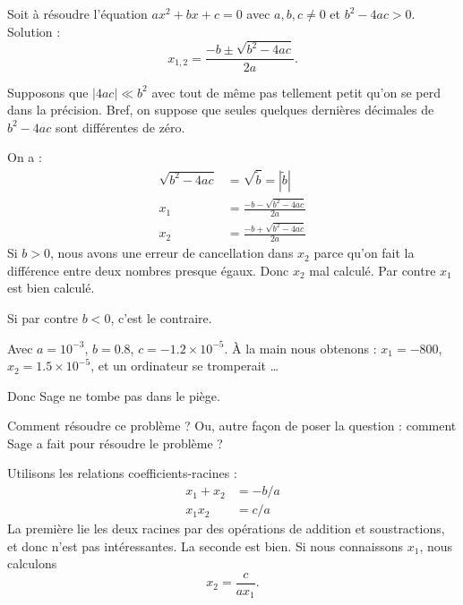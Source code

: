 \begin{example}
	Soit à résoudre l'équation \( ax^2+bx+c=0\) avec \( a,b,c\neq 0\) et \( b^2-4ac>0\). Solution :
	\begin{equation}
		x_{1,2}=\frac{ -b\pm\sqrt{b^2-4ac} }{ 2a }.
	\end{equation}

	Supposons que \( | 4ac |\ll b^2\) avec tout de même pas tellement petit qu'on se perd dans la précision. Bref, on suppose que seules quelques dernières décimales de \( b^2-4ac\) sont différentes de zéro.

	On a :
	\begin{subequations}
		\begin{align}
			\sqrt{b^2-4ac} & =\sqrt{\tilde b}= | \tilde b |    \\
			x_1            & =\frac{ -b-\sqrt{b^2-4ac} }{ 2a } \\
			x_2            & =\frac{ -b+\sqrt{b^2-4ac} }{ 2a }
		\end{align}
	\end{subequations}
	Si \( b>0\), nous avons une erreur de cancellation dans \( x_2\) parce qu'on fait la différence entre deux nombres presque égaux. Donc \( x_2\) mal calculé. Par contre \( x_1\) est bien calculé.


	Si par contre \( b<0\), c'est le contraire.


	Avec \( a=10^{-3}\), \( b=0.8\), \( c=-1.2\times 10^{-5}\). À la main nous obtenons : \( x_1=-800\), \( x_2=1.5\times 10^{-5}\), et un ordinateur se tromperait \ldots


	

	Donc Sage ne tombe pas dans le piège.
\end{example}

Comment résoudre ce problème ? Ou, autre façon de poser la question : comment Sage a fait pour résoudre le problème ?

Utilisons les relations coefficients-racines :
\begin{subequations}
	\begin{align}
		x_1+x_2 & =-b/a \\
		x_1x_2  & =c/a
	\end{align}
\end{subequations}
La première lie les deux racines par des opérations de addition et soustractions, et donc n'est pas intéressantes. La seconde est bien. Si nous connaissons \( x_1\), nous calculons
\begin{equation}
	x_2=\frac{ c }{ ax_1 }.
\end{equation}

